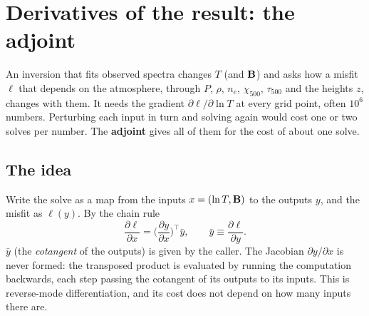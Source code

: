 \section{Derivatives of the result: the adjoint}\label{sec:adjoint}
An inversion that fits observed spectra changes $T$ (and $\mathbf B$) and asks how a misfit $\ell$ that depends on the atmosphere,
through $P$, $\rho$, $n_e$, $\chi_{500}$, $\tau_{500}$ and the heights $z$, changes with them. It needs the gradient
$\partial\ell/\partial\ln T$ at every grid point, often $10^6$ numbers. Perturbing each input in turn and solving again would
cost one or two solves per number. The \textbf{adjoint} gives all of them for the cost of about one solve.

\subsection{The idea}
Write the solve as a map from the inputs $x=(\ln T,\mathbf B)$ to the outputs $y$, and the misfit as $\ell(y)$. By the chain rule
\begin{equation}
\frac{\partial\ell}{\partial x}=\Big(\frac{\partial y}{\partial x}\Big)^{\!\top}\bar y,\qquad \bar y\equiv\frac{\partial\ell}{\partial y}.
\label{eq:adj}
\end{equation}
$\bar y$ (the \emph{cotangent} of the outputs) is given by the caller. The Jacobian $\partial y/\partial x$ is never formed:
the transposed product is evaluated by running the computation backwards, each step passing the cotangent of its outputs
to its inputs. This is reverse-mode differentiation, and its cost does not depend on how many inputs there are.

